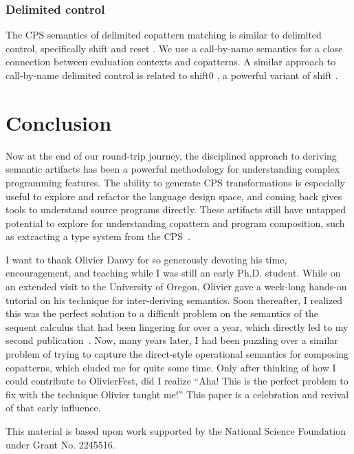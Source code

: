 \documentclass[sigplan,screen]{acmart}
\begin{document}
\subsubsection*{Delimited control}
%
The CPS semantics of delimited copattern matching is similar to delimited
control, specifically shift and reset
\cite{FunctionalAbstractionTypedContexts,AbstractingControl}.  We use a
call-by-name semantics for a close connection between evaluation contexts and
copatterns.  A similar approach to call-by-name delimited control
\cite{HerbelinG08} is related to shift0 \cite{DownenAriola2014CSCC}, a powerful
variant of shift \cite{materzok2011subtyping,materzok2012dynamic}.

\section{Conclusion}
\label{sec:conclusion}

Now at the end of our round-trip journey, the disciplined approach to deriving
semantic artifacts has been a powerful methodology for understanding complex
programming features.  The ability to generate CPS transformations is especially
useful to explore and refactor the language design space, and coming back gives
tools to understand source programs directly.  These artifacts still have
untapped potential to explore for understanding copattern and program
composition, such as extracting a type system from the CPS~\cite{FunctionalAbstractionTypedContexts}.


\begin{acks}
  I want to thank Olivier Danvy for so generously devoting his time,
  encouragement, and teaching while I was still an early Ph.D. student.  While
  on an extended visit to the University of Oregon, Olivier gave a week-long
  hands-on tutorial on his technique for inter-deriving semantics.  Soon
  thereafter, I realized this was the perfect solution to a difficult problem on
  the semantics of the sequent calculus that had been lingering for over a year,
  which directly led to my second publication~\cite{ADHNS2012CCSC}.  Now, many
  years later, I had been puzzling over a similar problem of trying to capture
  the direct-style operational semantics for composing copatterns, which eluded
  me for quite some time.  Only after thinking of how I could contribute to
  OlivierFest, did I realize ``Aha!  This is the perfect problem to fix with the
  technique Olivier taught me!''  This paper is a celebration and revival of
  that early influence.

  This material is based upon work supported by the National Science Foundation
  under Grant No. 2245516.
\end{acks}





\clearpage
\appendix


\end{document}
